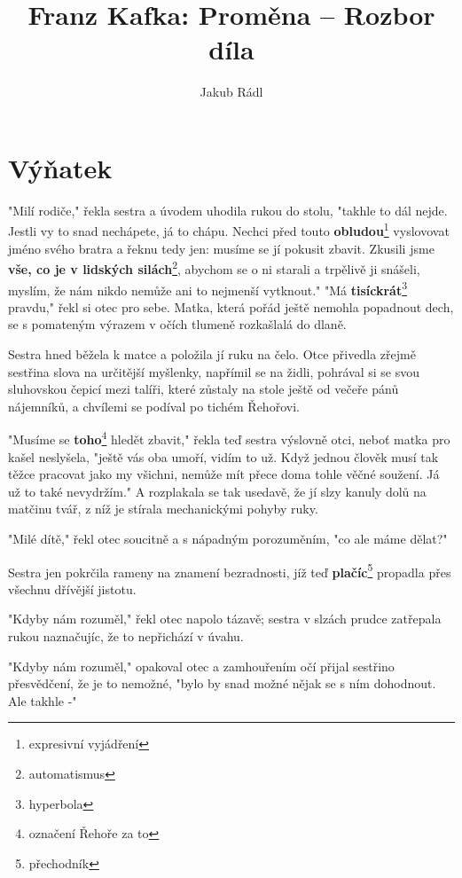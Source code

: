 \documentclass[10pt,a4paper]{article}
\date{}
\author{Jakub Rádl}
\title{Franz Kafka: Proměna -- Rozbor díla}
\begin{document}
\maketitle

\section*{Výňatek}
"Milí rodiče," řekla sestra a úvodem uhodila rukou do stolu, "takhle to dál nejde. Jestli vy to snad nechápete, já to chápu. Nechci před touto \textbf{obludou}\footnote{expresivní vyjádření} vyslovovat jméno svého bratra a řeknu tedy jen: musíme se jí pokusit zbavit. Zkusili jsme \textbf{vše, co je v lidských silách}\footnote{automatismus}, abychom se o ni starali a trpělivě ji snášeli, myslím, že nám nikdo nemůže ani to nejmenší vytknout." "Má \textbf{tisíckrát}\footnote{hyperbola} pravdu," řekl si otec pro sebe. Matka, která pořád ještě nemohla popadnout dech, se s pomateným výrazem v očích tlumeně rozkašlalá do dlaně. 

Sestra hned běžela k matce a položila jí ruku na čelo. Otce přivedla zřejmě sestřina slova na určitější myšlenky, napřímil se na židli, pohrával si se svou sluhovskou čepicí mezi talíři, které zůstaly na stole ještě od večeře pánů nájemníků, a chvílemi se podíval po tichém Řehořovi. 

"Musíme se \textbf{toho}\footnote{označení Řehoře za to} hledět zbavit," řekla teď sestra výslovně otci, neboť matka pro kašel neslyšela, "ještě vás oba umoří, vidím to už. Když jednou člověk musí tak těžce pracovat jako my všichni, nemůže mít přece doma tohle věčné soužení. Já už to také nevydržím." A rozplakala se tak usedavě, že jí slzy kanuly dolů na matčinu tvář, z níž je stírala mechanickými pohyby ruky. 

"Milé dítě," řekl otec soucitně a s nápadným porozuměním, "co ale máme dělat?" 

Sestra jen pokrčila rameny na znamení bezradnosti, jíž teď \textbf{plačíc}\footnote{přechodník} propadla přes všechnu dřívější jistotu. 

"Kdyby nám rozuměl," řekl otec napolo tázavě; sestra v slzách prudce zatřepala rukou naznačujíc, že to nepřichází v úvahu. 

"Kdyby nám rozuměl," opakoval otec a zamhouřením očí přijal sestřino přesvědčení, že je to nemožné, "bylo by snad možné nějak se s ním dohodnout. Ale takhle -" 
\end{document}
